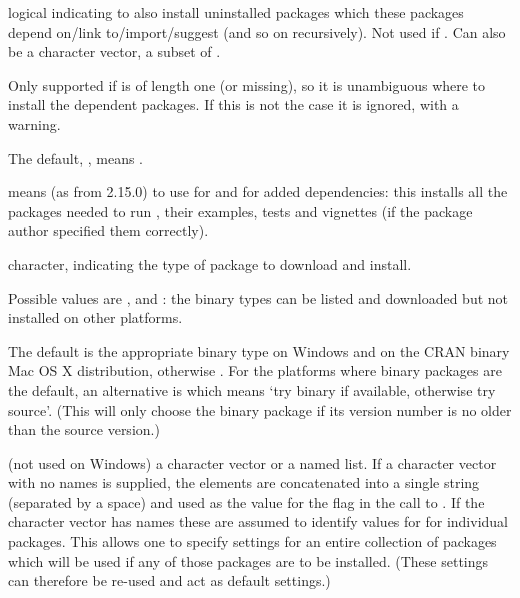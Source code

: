 \begin{Arguments}
\begin{ldescription}
\item[\code{dependencies}] logical indicating to also install uninstalled
packages which these packages depend on/link to/import/suggest
(and so on recursively).  Not used if .
Can also be a character vector, a subset of
.

Only supported if  is of length one (or missing),
so it is unambiguous where to install the dependent packages.  If
this is not the case it is ignored, with a warning.

The default, , means
.

 means (as from \R{} 2.15.0) to use
 for
 and
 for added dependencies:
this installs all the packages needed to run , their
examples, tests and vignettes (if the package author specified them
correctly).

\item[\code{type}] character, indicating the type of package to download and
install.

Possible values are ,  and
: the binary types can be listed and downloaded
but not installed on other platforms.

The default is the appropriate binary type on Windows and on
the CRAN binary Mac OS X distribution, otherwise .
For the platforms where binary packages are the default, an
alternative is  which means `try binary if
available, otherwise try source'.  (This will only choose the
binary package if its version number is no older than the source
version.)

\item[\code{configure.args}] 
(not used on Windows) a character vector or a named list.  If a
character vector with no names is supplied, the elements are
concatenated into a single string (separated by a space) and used as
the value for the  flag in the call to
.  If the character vector has names these
are assumed to identify values for  for
individual packages.  This allows one to specify settings for an
entire collection of packages which will be used if any of those
packages are to be installed.  (These settings can therefore be
re-used and act as default settings.)


\end{ldescription}
\end{Arguments}
